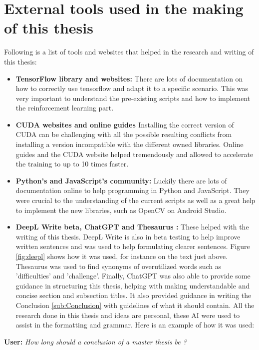 \documentclass[12pt]{report}
\begin{document}
\newpage
\section{External tools used in the making of this thesis}
Following is a list of tools and websites that helped in the research and writing of this thesis:
\begin{itemize}
    \item \textbf{TensorFlow \cite{bib:TensorFlow} library and websites: } There are lots of documentation on how to correctly use tensorflow and adapt it to a specific scenario. This was very important to understand the pre-existing scripts and how to implement the reinforcement learning part.
    \item \textbf{CUDA websites and online guides \cite{bib:CUDA} } Installing the correct version of CUDA can be challenging with all the possible resulting conflicts from installing a version incompatible with the different owned libraries. Online guides and the CUDA website helped tremendously and allowed to accelerate the training to up to 10 times faster.
    \item \textbf{Python's and JavaScript's \cite{bib:javascript} community: } Luckily there are lots of documentation online to help programming in Python and JavaScript. They were crucial to the understanding of the current scripts as well as a great help to implement the new libraries, such as OpenCV on Android Studio.
    \item \textbf{DeepL Write beta\cite{bib:DeepL}, ChatGPT \cite{bib:chatGPT} and Thesaurus \cite{bib:thesaurus}: } These helped with the writing of this thesis. DeepL Write is also in beta testing to help improve written sentences and was used to help formulating clearer sentences. Figure \ref{fig:deepl} shows how it was used, for instance on the text just above. Thesaurus was used to find synonyms of overutilized words such as 'difficulties' and 'challenge'. Finally, ChatGPT was also able to provide some guidance in structuring this thesis, helping with making understandable and concise section and subsection titles. It also provided guidance in writing the Conclusion \ref{sub:Conclusion} with guidelines of what it should contain. All the research done in this thesis and ideas are personal, these AI were used to assist in the formatting and grammar. Here is an example of how it was used: 
\end{itemize}

\textbf{User: } \textit{How long should a conclusion of a master thesis be ?} \\
\vspace{5pt}
\end{document}
